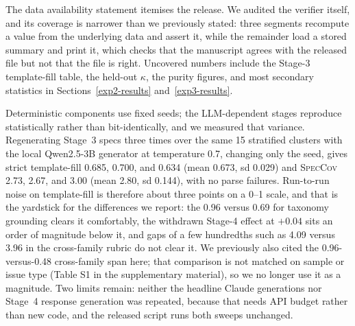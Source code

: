 \documentclass[preprint,12pt]{elsarticle}
\begin{document}
The data availability statement itemises the release. We audited the
verifier itself, and its coverage is narrower than we
previously stated: three segments recompute a value from the underlying data and assert it, while
the remainder load a stored summary and print it, which checks that the manuscript agrees with the
released file but not that the file is right. Uncovered numbers include the Stage-3 template-fill table, the held-out $\kappa$, the purity figures, and most secondary statistics in Sections~\ref{exp2-results} and~\ref{exp3-results}.

Deterministic components use fixed seeds; the LLM-dependent stages reproduce statistically rather
than bit-identically, and we measured that variance. Regenerating Stage~3 specs three times over
the same 15 stratified clusters with the local Qwen2.5-3B generator at temperature 0.7, changing
only the seed, gives strict template-fill 0.685, 0.700, and 0.634 (mean 0.673, sd 0.029) and
\textsc{SpecCov} 2.73, 2.67, and 3.00 (mean 2.80, sd 0.144), with no parse failures. Run-to-run
noise on template-fill is therefore about three points on a 0--1 scale, and that is the yardstick
for the differences we report: the 0.96 versus 0.69 for taxonomy grounding clears it comfortably,
the withdrawn Stage-4 effect at $+0.04$ sits an order of magnitude below it, and gaps of a few
hundredths such as 4.09 versus 3.96 in the cross-family rubric do not clear it. We previously also
cited the 0.96-versus-0.48 cross-family span here; that comparison is not matched on sample or
issue type (Table S1 in the supplementary material), so we no longer use it as a magnitude. Two limits remain:
neither the headline Claude generations nor Stage~4 response generation was repeated, because that
needs API budget rather than new code, and the released script runs both sweeps unchanged.
\end{document}
